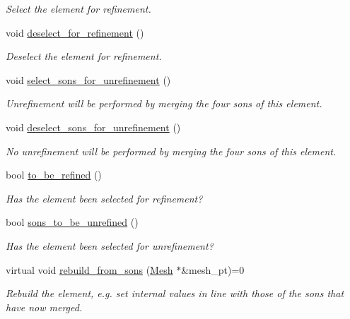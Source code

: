 \begin{DoxyCompactItemize}
\begin{DoxyCompactList}\small\item\em Select the element for refinement. \end{DoxyCompactList}\item 
void \hyperlink{classoomph_1_1RefineableElement_a984bf7bf6132e11648e3e54845d852b7}{deselect\+\_\+for\+\_\+refinement} ()
\begin{DoxyCompactList}\small\item\em Deselect the element for refinement. \end{DoxyCompactList}\item 
void \hyperlink{classoomph_1_1RefineableElement_a0f756235a17399d9175e05b29efed292}{select\+\_\+sons\+\_\+for\+\_\+unrefinement} ()
\begin{DoxyCompactList}\small\item\em Unrefinement will be performed by merging the four sons of this element. \end{DoxyCompactList}\item 
void \hyperlink{classoomph_1_1RefineableElement_afa0572f14ecd9cc2021f853218d7a659}{deselect\+\_\+sons\+\_\+for\+\_\+unrefinement} ()
\begin{DoxyCompactList}\small\item\em No unrefinement will be performed by merging the four sons of this element. \end{DoxyCompactList}\item 
bool \hyperlink{classoomph_1_1RefineableElement_ab5929530b4b5e5be7b2e52e4668c43fd}{to\+\_\+be\+\_\+refined} ()
\begin{DoxyCompactList}\small\item\em Has the element been selected for refinement? \end{DoxyCompactList}\item 
bool \hyperlink{classoomph_1_1RefineableElement_adbe65126a89ecd94236e5b9fc24f0f15}{sons\+\_\+to\+\_\+be\+\_\+unrefined} ()
\begin{DoxyCompactList}\small\item\em Has the element been selected for unrefinement? \end{DoxyCompactList}\item 
virtual void \hyperlink{classoomph_1_1RefineableElement_a33324be27833fa4b78279d17158215fa}{rebuild\+\_\+from\+\_\+sons} (\hyperlink{classoomph_1_1Mesh}{Mesh} $\ast$\&mesh\+\_\+pt)=0
\begin{DoxyCompactList}\small\item\em Rebuild the element, e.\+g. set internal values in line with those of the sons that have now merged. \end{DoxyCompactList}\item 

\end{DoxyCompactItemize}

